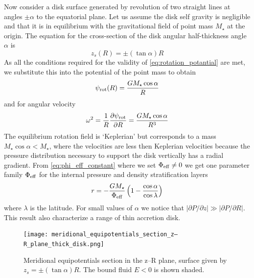 \documentclass[modern]{aastex62}
\begin{document}
Now consider a disk surface generated by revolution of two straight lines at angles $\pm\alpha$ to the equatorial plane. Let us assume the disk self gravity is negligible and that it is in equilibrium with the gravitational field of point mass $M_\star$ at the origin.
The equation for the cross-section of the disk angular half-thickness angle $\alpha$ is
\begin{equation}
z_s(R)=\pm(\tan\alpha)R
\end{equation}
As all the conditions required for the validity of \ref{eq:rotation_potantial} are met, we substitute this into the potential of the point mass to obtain
\begin{equation}
    \psi_{\rm{rot}}(R)=\frac{GM_\star \cos \alpha}{R}
\end{equation}
and for angular velocity 
\begin{equation}\label{eq:angular_velocity}
    \omega^2=\frac{1}{R}\frac{\partial \psi_{\rm{rot}}}{\partial R} = \frac{GM_\star\cos\alpha}{R^3}
\end{equation}
The equilibrium rotation field is `Keplerian' but corresponds to a mass $M_\star\cos\alpha<M_\star$, where the velocities are less then Keplerian velocities because the pressure distribution necessary to support the disk vertically has a radial gradient. From \ref{eq:phi_eff_constant} where we set $\Phi_{\rm{eff}}\neq0$ we get one parameter family $\Phi_{\rm{eff}}$ for the internal pressure and density stratification layers
\begin{equation}
    r= - \frac{GM_\star}{\Phi_{\rm{eff}}}
    \left(1- \frac{\cos\alpha}{\cos\lambda} \right)
\end{equation}
where $\lambda$ is the latitude. 
For small values of $\alpha$ we notice that $|\partial P/\partial z| \gg |\partial P/\partial R|$. This result also characterize a range of thin accretion disk.
\begin{figure}[ht!]
\texttt{[image: meridional\_equipotentials\_section\_z–R\_plane\_thick\_disk.png]}
\caption{Meridional equipotentials section in the z–R plane, surface given
by $z_s=\pm(\tan \alpha)R$. The bound fluid $E < 0$ is shown shaded.}
\label{fig:thick-disk-tori-struct}
\end{figure}
\end{document}
